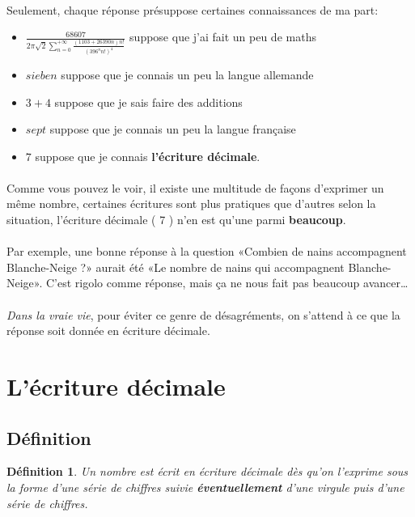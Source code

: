 \documentclass[12pt]{article}
\newtheorem{definition}{Définition}
\begin{document}
\paragraph{}
Seulement, chaque réponse présuppose certaines connaissances de ma part:
\begin{itemize}
  \item $\frac{68607}{2 \pi \sqrt{2} \sum_{n = 0}^{+ \infty}\frac{(1103 + 26390n)n!}{(396^{n}n!)^{4}}}$ suppose que j'ai fait un peu de maths
  \item $sieben$ suppose que je connais un peu la langue allemande
  \item $3+4$ suppose que je sais faire des additions
  \item $sept$ suppose que je connais un peu la langue française
  \item $7$ suppose que je connais \textbf{l'écriture décimale}.
\end{itemize}

\paragraph{}
Comme vous pouvez le voir, il existe une multitude de façons d'exprimer un même nombre, certaines écritures sont plus pratiques que d'autres selon la situation, l'écriture décimale ( 7 ) n'en est qu'une parmi \textbf{beaucoup}.


\paragraph{}
Par exemple, une bonne réponse à la question «Combien de nains accompagnent Blanche-Neige ?» aurait été «Le nombre de nains qui accompagnent Blanche-Neige». C'est rigolo comme réponse, mais ça ne nous fait pas beaucoup avancer…

\paragraph{}
\emph{Dans la vraie vie}, pour éviter ce genre de désagréments, on s'attend à ce que la réponse soit donnée en écriture décimale.

\section{L'écriture décimale}

\subsection{Définition}
\begin{definition}
Un nombre est écrit en écriture décimale dès qu'on l'exprime sous la forme d'une série de chiffres suivie \textbf{éventuellement} d'une virgule puis d'une série de chiffres.
\end{definition}
\end{document}
